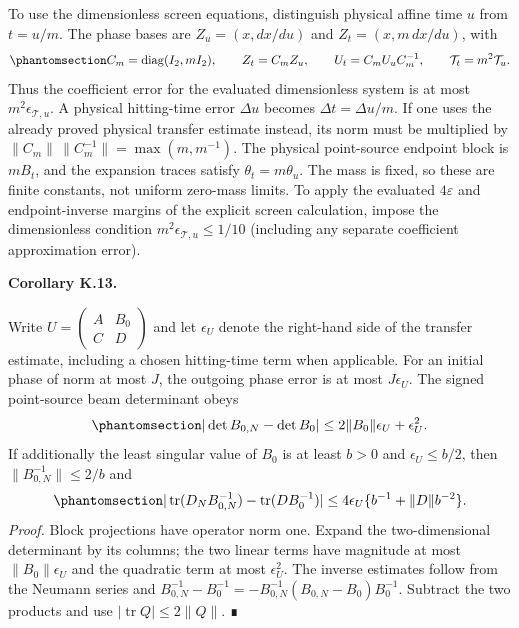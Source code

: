 \documentclass[
  english,
  11pt,
  reqno]{amsart}
\makeatletter
\newcommand{\pandocstatementheading}[1]{%
  \par\addpenalty{\@beginparpenalty}%
  \addvspace{.5\baselineskip plus .2\baselineskip minus .2\baselineskip}%
  {\normalfont\bfseries #1\par}%
  \nobreak\@afterindenttrue\@afterheading
}
\makeatother
\begin{document}
To use the dimensionless screen equations, distinguish physical affine
time \(u\) from \(t=u/m\). The phase bases are \(Z_u=(x,dx/du)\) and
\(Z_t=(x,m\,dx/du)\), with
\begin{equation}\protect\phantomsection\label{eq:sh-phase-time-dictionary}{
 C_m=\operatorname{diag}(I_2,mI_2),\qquad
 Z_t=C_mZ_u,\qquad U_t=C_mU_uC_m^{-1},\qquad
 \mathcal T_t=m^2\mathcal T_u.
}\end{equation} Thus the coefficient error for the evaluated
dimensionless system is at most \(m^2\epsilon_{\mathcal T,u}\). A
physical hitting-time error \(\Delta u\) becomes
\(\Delta t=\Delta u/m\). If one uses the already proved physical
transfer estimate instead, its norm must be multiplied by
\(\|C_m\|\,\|C_m^{-1}\|=\max(m,m^{-1})\). The physical point-source
endpoint block is \(mB_t\), and the expansion traces satisfy
\(\theta_t=m\theta_u\). The mass is fixed, so these are finite
constants, not uniform zero-mass limits. To apply the evaluated
\(4\varepsilon\) and endpoint-inverse margins of the explicit screen
calculation, impose the dimensionless condition
\(m^2\epsilon_{\mathcal T,u}\le1/10\) (including any separate
coefficient approximation error).

\pandocstatementheading{\protect{}\label{cor:sh-optical-observables}Corollary K.13.}

Write \(U=\left(\begin{smallmatrix}A&B_0\\ C&D\end{smallmatrix}\right)\)
and let \(\epsilon_U\) denote the right-hand side of the transfer
estimate, including a chosen hitting-time term when applicable. For an
initial phase of norm at most \(J\), the outgoing phase error is at most
\(J\epsilon_U\). The signed point-source beam determinant obeys
\begin{equation}\protect\phantomsection\label{eq:sh-beam-determinant-error}{
 |\det B_{0,N}-\det B_0|
 \le2\|B_0\|\epsilon_U+\epsilon_U^2.
}\end{equation} If additionally the least singular value of \(B_0\) is
at least \(b>0\) and \(\epsilon_U\le b/2\), then
\(\|B_{0,N}^{-1}\|\le2/b\) and
\begin{equation}\protect\phantomsection\label{eq:sh-expansion-error}{
 |\operatorname{tr}(D_NB_{0,N}^{-1})-\operatorname{tr}(DB_0^{-1})|
 \le4\epsilon_U\{b^{-1}+\|D\|b^{-2}\}.
}\end{equation} \emph{Proof.} Block projections have operator norm one.
Expand the two-dimensional determinant by its columns; the two linear
terms have magnitude at most \(\|B_0\|\epsilon_U\) and the quadratic
term at most \(\epsilon_U^2\). The inverse estimates follow from the
Neumann series and
\(B_{0,N}^{-1}-B_0^{-1}=-B_{0,N}^{-1}(B_{0,N}-B_0)B_0^{-1}\). Subtract
the two products and use \(|\operatorname{tr}Q|\le2\|Q\|\). ∎
\end{document}
